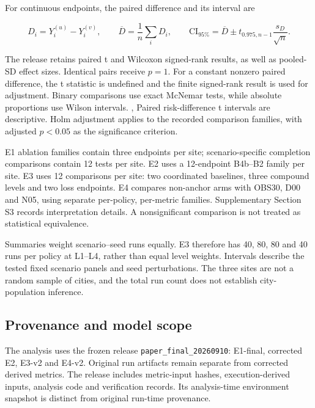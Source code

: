 \documentclass[]{interact}
\theoremstyle{plain}
\theoremstyle{definition}
\theoremstyle{remark}
\begin{document}
For continuous endpoints, the paired difference and its interval are

\begin{equation*}
D_i=Y_i^{(u)}-Y_i^{(v)},\qquad
\overline D=\frac1n\sum_iD_i,\qquad
\mathrm{CI}_{95\%}=\overline D\pm t_{0.975,n-1}\frac{s_D}{\sqrt n}. \tag{13}
\end{equation*}

The release retains paired t and Wilcoxon signed-rank results, as well as pooled-SD effect sizes. \citep{ref15} Identical pairs receive $p=1$. For a constant nonzero paired difference, the t statistic is undefined and the finite signed-rank result is used for adjustment. Binary comparisons use exact McNemar tests, while absolute proportions use Wilson intervals. \citep{ref16}, \citep{ref17} Paired risk-difference t intervals are descriptive. Holm adjustment applies to the recorded comparison families, with adjusted $p<0.05$ as the significance criterion. \citep{ref18}

E1 ablation families contain three endpoints per site; scenario-specific completion comparisons contain 12 tests per site. E2 uses a 12-endpoint B4b--B2 family per site. E3 uses 12 comparisons per site: two coordinated baselines, three compound levels and two loss endpoints. E4 compares non-anchor arms with OBS30, D00 and N05, using separate per-policy, per-metric families. Supplementary Section S3 records interpretation details. A nonsignificant comparison is not treated as statistical equivalence.

Summaries weight scenario--seed runs equally. E3 therefore has 40, 80, 80 and 40 runs per policy at L1--L4, rather than equal level weights. Intervals describe the tested fixed scenario panels and seed perturbations. The three sites are not a random sample of cities, and the total run count does not establish city-population inference.

\subsection{Provenance and model scope}

The analysis uses the frozen release \nolinkurl{paper_final_20260910}: E1-final, corrected E2, E3-v2 and E4-v2. Original run artifacts remain separate from corrected derived metrics. The release includes metric-input hashes, execution-derived inputs, analysis code and verification records. Its analysis-time environment snapshot is distinct from original run-time provenance.
\end{document}
